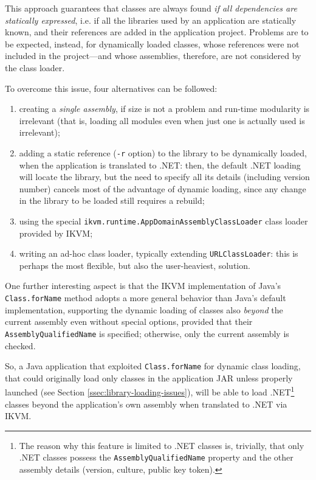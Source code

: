 \noindent This approach guarantees that classes are always found \textit{if all dependencies are statically expressed}, i.e. if all the libraries used by an application are statically known, and their references are added in the application project.
Problems are to be expected, instead, for dynamically loaded classes, whose references were not included in the project---and whose assemblies, therefore, are not considered by the class loader.

To overcome this issue, four alternatives can be followed:
\begin{enumerate}
  \item creating a \textit{single assembly}, if size is not a problem and run-time modularity is irrelevant (that is, loading all modules even when just one is actually used is irrelevant);
  \item adding a static reference (\texttt{-r} option) to the library to be dynamically loaded, when the application is translated to .NET: then, the default .NET loading will locate the library, but the need to specify all its details (including version number) cancels most of the advantage of dynamic loading, since any change in the library to be loaded still requires a rebuild;
  \item using the special \texttt{ikvm.runtime.AppDomainAssemblyClassLoader}
  class loader provided by IKVM;
  \item writing an ad-hoc class loader, typically extending \texttt{URLClassLoader}: this is perhaps the most flexible, but also the user-heaviest, solution.
\end{enumerate}

\noindent One further interesting aspect is that the IKVM implementation of Java's \texttt{Class.forName} method adopts a more general behavior than Java's default implementation, supporting the dynamic loading of classes also \textit{beyond} the current assembly even without special options, provided that their \texttt{AssemblyQualifiedName} is specified; otherwise, only the current assembly is checked.

So, a Java application that exploited \texttt{Class.forName} for dynamic class loading, that could originally load only classes in the application JAR unless properly launched (see Section \ref{ssec:library-loading-issues}), will be able to load .NET\footnote{The reason why this feature is limited to .NET classes is, trivially, that only .NET classes possess the \texttt{AssemblyQualifiedName} property and the other assembly details (version, culture, public key token).} classes beyond the application's own assembly when translated to .NET via IKVM.

